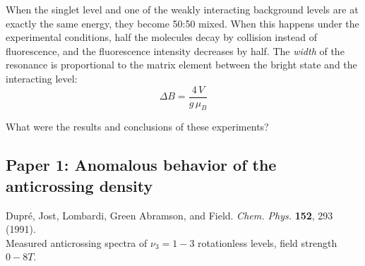 \documentclass[12pt]{mitthesis}
\begin{document}
When the singlet level and one of the weakly interacting background
levels are at exactly the same energy, they become 50:50 mixed.  When
this happens under the experimental conditions, half the molecules
decay by collision instead of fluorescence, and the fluorescence
intensity decreases by half.  The \emph{width} of the resonance is
proportional to the matrix element between the bright state and the
interacting level:
\begin{equation}
\Delta B = \frac{4\,V}{g\,\mu_B}
\end{equation}

What were the results and conclusions of these experiments?

\subsection{Paper 1: Anomalous behavior of the anticrossing density}

Dupr\'{e}, Jost, Lombardi, Green Abramson, and Field.
\emph{Chem. Phys.}  \textbf{152}, 293 (1991).\\
Measured anticrossing spectra of $\nu_3=1-3$ rotationless levels,
field strength $0-8T$.
\end{document}

